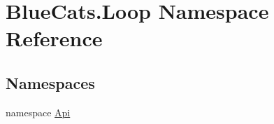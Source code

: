 \hypertarget{namespace_blue_cats_1_1_loop}{}\section{Blue\+Cats.\+Loop Namespace Reference}
\label{namespace_blue_cats_1_1_loop}
\subsection*{Namespaces}
\begin{DoxyCompactItemize}
\item 
namespace \mbox{\hyperlink{namespace_blue_cats_1_1_loop_1_1_api}{Api}}
\end{DoxyCompactItemize}
